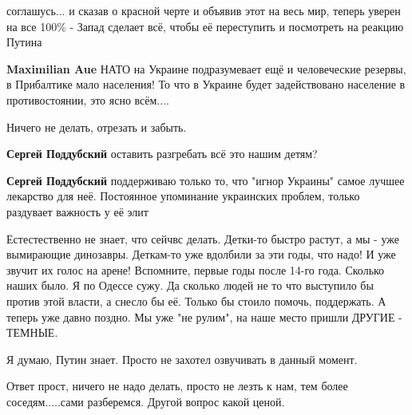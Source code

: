 \begin{itemize}
\begin{itemize}
соглашусь... и сказав о красной черте и объявив этот на весь мир, теперь уверен
на все 100\% - Запад сделает всё, чтобы её переступить и посмотреть на реакцию
Путина


\textbf{Maximilian Aue} НАТО на Украине подразумевает ещё и человеческие резервы, в Прибалтике мало населения! То что в Украине будет задействовано население в противостоянии, это ясно всём....
\end{itemize} %

Ничего не делать, отрезать и забыть.

\begin{itemize} %
\textbf{Сергей Поддубский} оставить разгребать всё это нашим детям?

\textbf{Сергей Поддубский} поддерживаю только то, что "игнор Украины" самое лучшее лекарство для неё. Постоянное упоминание украинских проблем, только раздувает важность у её элит
\end{itemize} %


\obeycr
Естестественно не знает, что сейчвс делать.
Детки-то быстро растут, а мы - уже вымирающие динозавры.
Деткам-то уже вдолбили за эти годы, что надо! И уже звучит их голос на арене!
Вспомните, первые годы после 14-го года. Сколько наших было.
Я по Одессе сужу. Да сколько людей не то что выступило бы против этой власти,
а снесло бы её. Только бы стоило помочь, поддержать.
А теперь уже давно поздно. Мы уже "не рулим", на наше место пришли ДРУГИЕ - ТЕМНЫЕ.
\restorecr

Я думаю, Путин знает. Просто не захотел озвучивать в данный момент.

Ответ прост, ничего не надо делать, просто не лезть к нам, тем более соседям.....сами разберемся. Другой вопрос какой ценой.
\end{itemize} %

